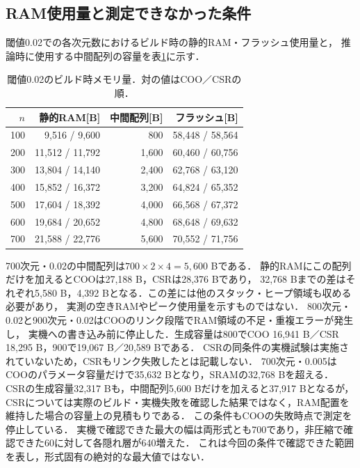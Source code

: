 \documentclass[a4paper,11pt]{article}
\begin{document}
\subsection{RAM使用量と測定できなかった条件}
閾値0.02での各次元数におけるビルド時の静的RAM・フラッシュ使用量と，
推論時に使用する中間配列の容量を表\ref{tab:memory}に示す．

\begin{table}[H]\centering\small
\caption{閾値0.02のビルド時メモリ量．対の値はCOO／CSRの順．}\label{tab:memory}
\setlength{\tabcolsep}{5pt}
\begin{tabular}{rrrr}\toprule
$n$&静的RAM[B]&中間配列[B]&フラッシュ[B]\\\midrule
100 & 9,516 / 9,600 & 800 & 58,448 / 58,564\\\midrule
200 & 11,512 / 11,792 & 1,600 & 60,460 / 60,756\\\midrule
300 & 13,804 / 14,140 & 2,400 & 62,768 / 63,120\\\midrule
400 & 15,852 / 16,372 & 3,200 & 64,824 / 65,352\\\midrule
500 & 17,604 / 18,392 & 4,000 & 66,568 / 67,372\\\midrule
600 & 19,684 / 20,652 & 4,800 & 68,648 / 69,632\\\midrule
700 & 21,588 / 22,776 & 5,600 & 70,552 / 71,756\\\midrule

\bottomrule\end{tabular}
\end{table}
%
700次元・0.02の中間配列は$700\times2\times4=5,600$ Bである．
静的RAMにこの配列だけを加えるとCOOは27,188 B，CSRは28,376 Bであり，
32,768 Bまでの差はそれぞれ5,580 B，4,392 Bとなる．この差には他のスタック・ヒープ領域も収める必要があり，
実測の空きRAMやピーク使用量を示すものではない．
800次元・0.02と900次元・0.02はCOOのリンク段階でRAM領域の不足・重複エラーが発生し，
実機への書き込み前に停止した．生成容量は800でCOO 16,941 B／CSR 18,295 B，900で19,067 B／20,589 Bである．
CSRの同条件の実機試験は実施されていないため，CSRもリンク失敗したとは記載しない．
700次元・0.005はCOOのパラメータ容量だけで35,632 Bとなり，SRAMの32,768 Bを超える．
CSRの生成容量32,317 Bも，中間配列5,600 Bだけを加えると37,917 Bとなるが，
CSRについては実際のビルド・実機失敗を確認した結果ではなく，RAM配置を維持した場合の容量上の見積もりである．
この条件もCOOの失敗時点で測定を停止している．
実機で確認できた最大の幅は両形式とも700であり，非圧縮で確認できた60に対して各隠れ層が640増えた．
これは今回の条件で確認できた範囲を表し，形式固有の絶対的な最大値ではない．
\end{document}
